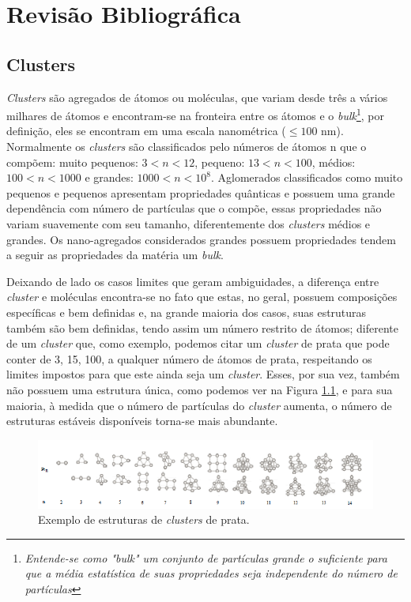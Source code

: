 \chapter{Revisão Bibliográfica}
\label{revisao_bibliografica}

\section{Clusters}
\label{c2-clusters}

\textit{Clusters} são agregados de átomos ou moléculas, que variam desde três a vários milhares de átomos e encontram-se na fronteira entre os átomos e o \textit{bulk}\footnote{\textit{Entende-se como "bulk" um conjunto de partículas grande o suficiente para que a média estatística de suas propriedades seja independente do número de partículas\cite{bulk}}}\cite{Heer,Brack}, por definição, eles se encontram em uma escala nanométrica ($ \leqslant 100$ nm).
Normalmente os \textit{clusters} são classificados pelo números de átomos n que o compõem: muito pequenos: $3<n<12$, pequeno: $13<n<100$, médios: $100<n<1000$ e grandes: $1000<n<10^8$.
Aglomerados classificados como muito pequenos e pequenos apresentam propriedades quânticas e possuem uma grande dependência com número de partículas que o compõe, essas propriedades não variam suavemente com seu tamanho, diferentemente dos \textit{clusters} médios e grandes.
Os nano-agregados considerados grandes possuem propriedades tendem a seguir as propriedades da matéria um \textit{bulk}.


Deixando de lado os casos limites que geram ambiguidades, a diferença entre \textit{cluster} e moléculas encontra-se no fato que estas, no geral, possuem composições específicas e bem definidas e, na grande maioria dos casos, suas estruturas também são bem definidas, tendo  assim um número restrito de átomos; diferente de um \textit{cluster} que, como exemplo, podemos citar um \textit{cluster} de prata que pode conter de 3, 15, 100, a qualquer número de átomos de prata, respeitando os limites impostos para que este ainda seja um \textit{cluster}. Esses, por sua vez, também não possuem uma estrutura única, como podemos ver na Figura \ref{fig:estrutura_cluster_ag}, e para sua maioria, à medida que o número de partículas do \textit{cluster} aumenta, o número de estruturas estáveis disponíveis torna-se mais abundante. 

\begin{figure}
  \centering
  \includegraphics[width=1\textwidth]{images/clusters/estrutura_cluster_ag}
  \caption{ Exemplo de estruturas de \textit{clusters} de prata.\cite{dissertacao_anderson}  }
  \label{fig:estrutura_cluster_ag}
\end{figure}


